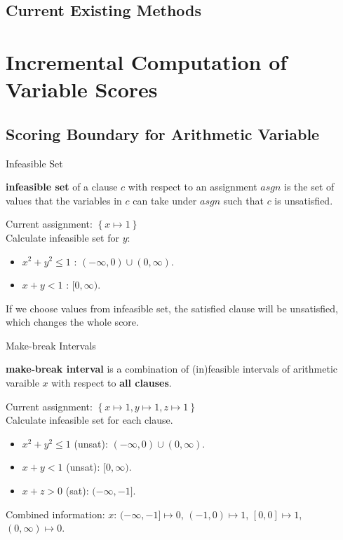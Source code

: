 \subsection{Current Existing Methods}

\section{Incremental Computation of Variable Scores}
\subsection{Scoring Boundary for Arithmetic Variable}

\begin{frame}{Infeasible Set}
    \begin{definition}
        \textbf{infeasible set} of a clause $c$ with respect to an assignment $\mathit{asgn}$ is the set of values that the variables in $c$ can take under $\mathit{asgn}$ such that $c$ is unsatisfied.
    \end{definition}
    \begin{example}
        Current assignment: $\left\{ x\mapsto 1\right\}$ \\
        Calculate infeasible set for $y$:
        \begin{itemize}
            \item $x^2+y^2\le 1$ : $(-\infty, 0) \cup (0, \infty)$.
            \item $x+y<1$ : $[0,\infty)$.
        \end{itemize}
    \end{example}
    If we choose values from infeasible set, the satisfied clause will be unsatisfied, which changes the whole score.
\end{frame}

\begin{frame}{Make-break Intervals}
    \begin{definition}
        \textbf{make-break interval} is a 
    combination of (in)feasible intervals of arithmetic varaible $x$ with respect to \textbf{all clauses}.
    \end{definition}

    \begin{example}
        Current assignment: $\left\{ x\mapsto 1, y\mapsto 1, z\mapsto 1 \right\}$ \\
        Calculate infeasible set for each clause.
        \begin{itemize}
            \item $x^2+y^2\le 1$ (unsat): $(-\infty, 0) \cup (0, \infty)$.
            \item $x+y<1$ (unsat): $[0,\infty)$.
            \item $x+z>0$ (sat): $(-\infty,-1]$.
        \end{itemize}
        Combined information: $x$: $(-\infty,-1]\mapsto 0$, $(-1,0)\mapsto 1$, $[0,0]\mapsto 1$, $(0,\infty)\mapsto 0$.
    \end{example}
\end{frame}

